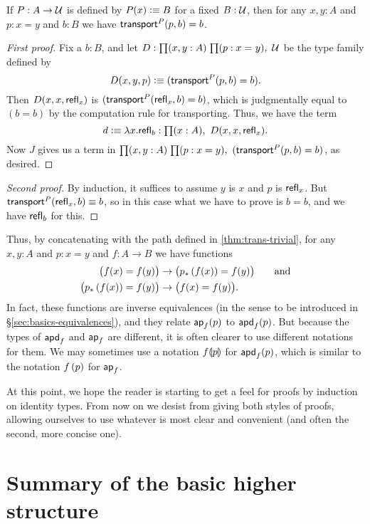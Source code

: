 \begin{lem}\label{thm:trans-trivial}
  If $P:A\to\mathcal{U}$ is defined by $P(x) \vcentcolon\equiv B$ for a fixed $B:\mathcal{U}$, then for any $x,y:A$ and $p:x=y$ and $b:B$ we have $\mathsf{transport}^{P}(p,b) = b$.
\end{lem}
\begin{proof}[First proof]
  Fix a $b:B$, and let $D:\prd{x,y:A}{p:\id{x}{y}} \type$ be the type family defined by
  \[ D(x,y,p) \vcentcolon\equiv (\mathsf{transport}^{P}(p,b) = b). \]
  Then $D(x,x,\mathsf{refl}_{x})$ is $(\mathsf{transport}^{P}(\mathsf{refl}_{x},b) = b)$, which is judgmentally equal to $(b=b)$ by the computation rule for transporting.
  Thus, we have the term
  \[ d \defeq \lambda x.\refl{b} : \prd{x:A} D(x,x,\refl x). \]
  Now $J$ gives us a term in $\prd{x,y:A}{p:x=y}(\transfib P p b = b)$, as desired.
\end{proof}
\begin{proof}[Second proof]
  By induction, it suffices to assume $y$ is $x$ and $p$ is $\mathsf{refl}_{x}$.
  But $\mathsf{transport}^{P}(\mathsf{refl}_{x},b) \equiv b$, so in this case what we have to prove is $b=b$, and we have $\mathsf{refl}_{b}$ for this.
\end{proof}

Thus, by concatenating with the path defined in \autoref{thm:trans-trivial}, for any $x,y:A$ and $p:x=y$ and $f:A\to B$ we have functions
\begin{align}
  \big(f(x) = f(y)\big) &\to \big({p}_{*}\left({f(x)}\right) = f(y)\big)\label{eq:ap-to-apd}
  \qquad\text{and} \\
  \big({p}_{*}\left({f(x)}\right) = f(y)\big) &\to \big(f(x) = f(y)\big).\label{eq:apd-to-ap}
\end{align}
In fact, these functions are inverse equivalences (in the sense to be introduced in \S\ref{sec:basics-equivalences}), and they relate $\mathsf{ap}_{f} (p)$  to $\mathsf{apd}_{f} (p)$.
But because the types of $\mathsf{apd}_{f}$ and $\mathsf{ap}_{f}$ are different, it is often clearer to use different notations for them.
We may sometimes use a notation ${f}\llparenthesis{p}\rrparenthesis$ for $\mathsf{apd}_{f}(p)$, which is similar to the notation ${f}\left({p}\right)$ for $\mathsf{ap}_{f}$.

\medskip

At this point, we hope the reader is starting to get a feel for proofs by induction on identity types.
From now on we desist from giving both styles of proofs, allowing ourselves to use whatever is most clear and convenient (and often the second, more concise one).


\section{Summary of the basic higher structure}
\label{sec:basics-summary}

